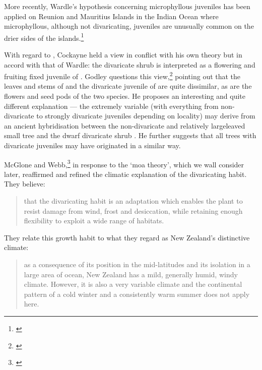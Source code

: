 More recently, Wardle's hypothesis concerning microphyllous juveniles has been applied on Reunion and Mauritius Islands in the Indian Ocean where microphyllous, although not divaricating, juveniles are unusually common on the drier sides of the islands.\footnote{\cite{friedmann1976observations}}

With regard to , Cockayne held a view in conflict with his own theory but in accord with that of Wardle: the divaricate shrub  is interpreted as a flowering and fruiting fixed juvenile of .
Godley questions this view,\footnote{\cite{godley1979leonard}} pointing out that the leaves and stems of  and the divaricate juvenile of  are quite dissimilar, as are the flowers and seed pods of the two species.
He proposes an interesting and quite different explanation --- the extremely variable  (with everything from non-divaricate to strongly divaricate juveniles depending on locality) may derive from an ancient hybridisation between the non-divaricate and relatively largeleaved small tree  and the dwarf divaricate shrub .
He further suggests that all trees with divaricate juveniles may have originated in a similar way.

McGlone and Webb,\footnote{\cite{mcglone1981selective}} in response to the `moa theory', which we wall consider later, reaffirmed and refined the climatic explanation of the divaricating habit.
They believe:

\begin{quote}
	that the divaricating habit is an adaptation which enables the plant to resist damage from wind, frost and desiccation, while retaining enough flexibility to exploit a wide range of habitats.
\end{quote}

They relate this growth habit to what they regard as New Zealand's distinctive climate:

\begin{quote}
	as a consequence of its position in the mid-latitudes and its isolation in a large area of ocean, New Zealand has a mild, generally humid, windy climate.
	However, it is also a very variable climate and the continental pattern of a cold winter and a consistently warm summer does not apply here.
\end{quote}

